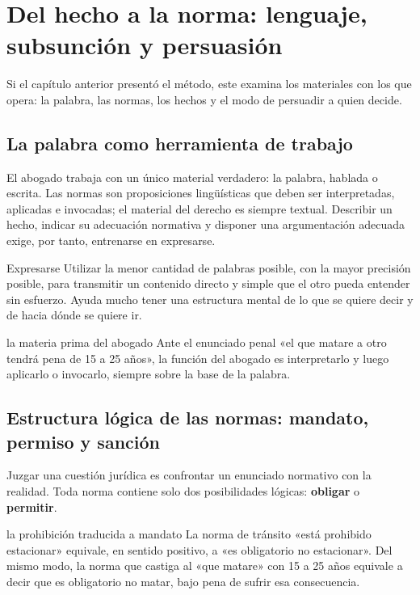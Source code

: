 \documentclass[12pt,oneside]{book}
\begin{document}
\chapter{Del hecho a la norma: lenguaje, subsunción y persuasión}

Si el capítulo anterior presentó el método, este examina los materiales con los que opera: la palabra, las normas, los hechos y el modo de persuadir a quien decide.

\section{La palabra como herramienta de trabajo}

El abogado trabaja con un único material verdadero: la palabra, hablada o escrita. Las normas son proposiciones lingüísticas que deben ser interpretadas, aplicadas e invocadas; el material del derecho es siempre textual. Describir un hecho, indicar su adecuación normativa y disponer una argumentación adecuada exige, por tanto, entrenarse en expresarse.

\begin{definicion}{Expresarse}
Utilizar la menor cantidad de palabras posible, con la mayor precisión posible, para transmitir un contenido directo y simple que el otro pueda entender sin esfuerzo. Ayuda mucho tener una estructura mental de lo que se quiere decir y de hacia dónde se quiere ir.
\end{definicion}

\begin{ejemplo}{la materia prima del abogado}
Ante el enunciado penal «el que matare a otro tendrá pena de 15 a 25 años», la función del abogado es interpretarlo y luego aplicarlo o invocarlo, siempre sobre la base de la palabra.
\end{ejemplo}

\section{Estructura lógica de las normas: mandato, permiso y sanción}

Juzgar una cuestión jurídica es confrontar un enunciado normativo con la realidad. Toda norma contiene solo dos posibilidades lógicas: \textbf{obligar} o \textbf{permitir}.

\begin{ejemplo}{la prohibición traducida a mandato}
La norma de tránsito «está prohibido estacionar» equivale, en sentido positivo, a «es obligatorio no estacionar». Del mismo modo, la norma que castiga al «que matare» con 15 a 25 años equivale a decir que es obligatorio no matar, bajo pena de sufrir esa consecuencia.
\end{ejemplo}
\end{document}
